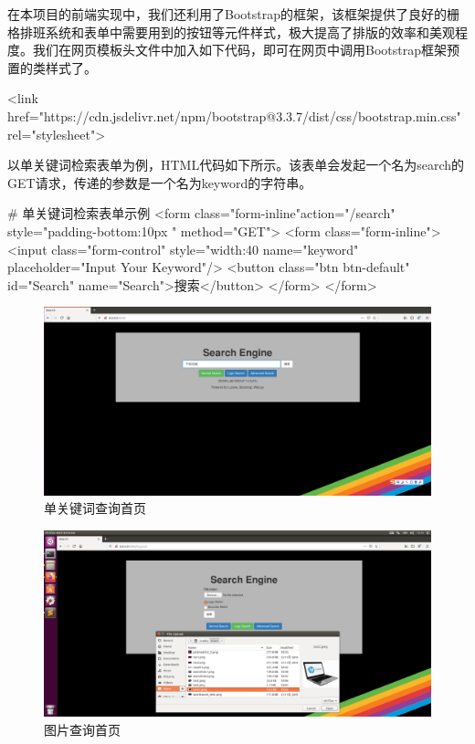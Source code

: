 在本项目的前端实现中，我们还利用了Bootstrap的框架，该框架提供了良好的栅格排班系统和表单中需要用到的按钮等元件样式，极大提高了排版的效率和美观程度。我们在网页模板头文件中加入如下代码，即可在网页中调用Bootstrap框架预置的类样式了。

\begin{python}
<link href="https://cdn.jsdelivr.net/npm/bootstrap@3.3.7/dist/css/bootstrap.min.css" rel="stylesheet">
\end{python}

以单关键词检索表单为例，HTML代码如下所示。该表单会发起一个名为search的GET请求，传递的参数是一个名为keyword的字符串。

\begin{python}
# 单关键词检索表单示例
<form class="form-inline"action="/search" style="padding-bottom:10px " method="GET">
	<form class="form-inline">
	<input class="form-control"  style="width:40%
		   name="keyword" placeholder="Input Your Keyword"/>
	<button class="btn btn-default" id="Search" name="Search">搜索</button>
	</form>
</form>
\end{python}


\begin{figure}[htbp]
\centering
\includegraphics[width=13.5cm]{img/zlt/searchidx1.png}
\caption{单关键词查询首页}
\label{fig:zlt_index1}
\end{figure}

\begin{figure}[htbp]
\centering
\includegraphics[width=13.5cm]{img/zlt/searchidx2.png}
\caption{图片查询首页}
\label{fig:zlt_index2}
\end{figure}

